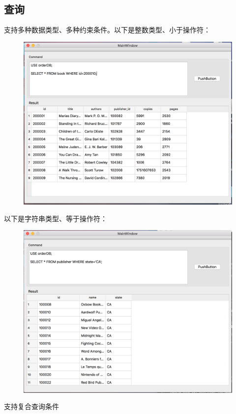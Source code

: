 \subsection{查询}
支持多种数据类型、多种约束条件。以下是整数类型、小于操作符：
\begin{figure}[H]
\centering
\includegraphics[width=5in]{Figures/screen_shot/basic1.png}
\end{figure}
以下是字符串类型、等于操作符：
\begin{figure}[H]
\centering
\includegraphics[width=5in]{Figures/screen_shot/basic2.png}
\end{figure}
支持复合查询条件
